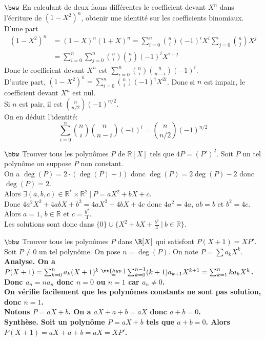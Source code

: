 \documentclass[11pt]{article}
\begin{document}
\begin{exercice}{$\bww$}{}
    En calculant de deux faons différentes le coefficient devant $X^n$ dans l'écriture de $(1-X^2)^n$, obtenir une identité sur les coefficients binomiaux.
    \tcblower
    D'une part
    \begin{align*}
        (1-X^2)^n &= (1-X)^n(1+X)^n = \sum_{i=0}^n\binom{n}{i}(-1)^iX^i\sum_{j=0}\binom{n}{j}X^j\\
        &=\sum_{i=0}^n\sum_{j=0}^n\binom{n}{i}\binom{n}{j}(-1)^iX^{i+j}
    \end{align*}
    Donc le coefficient devant $X^n$ est $\sum_{i=0}^n\binom{n}{i}\binom{n}{n-i}(-1)^i$.\\
    D'autre part, $(1-X^2)^n=\sum_{i=0}^n\binom{n}{i}(-1)^iX^{2i}$. Donc si $n$ est impair, le coefficient devant $X^n$ est nul.\\
    Si $n$ est pair, il est $\binom{n}{n/2}(-1)^{n/2}$.\\
    On en déduit l'identité: 
    \begin{equation*}
        \sum_{i=0}^n\binom{n}{i}\binom{n}{n-i}(-1)^i=\binom{n}{n/2}(-1)^{n/2}
    \end{equation*}
\end{exercice}

\begin{exercice}{$\bbw$}{}
    Trouver tous les polynômes $P$ de $\mathbb{R}[X]$ tels que $4P=(P')^2$.
    \tcblower
    Soit $P$ un tel polynôme on suppose $P$ non constant.\\
    On a $\deg(P)=2\cdot(\deg(P)-1)$ donc $\deg(P)=2\deg(P)-2$ donc $\deg(P)=2$.\\
    Alors $\exists (a,b,c)\in\mathbb{R}^*\times\mathbb{R}^2 ~ | ~ P = aX^2 + bX + c$.\\
    Donc $4a^2X^2 + 4abX + b^2 = 4aX^2 + 4bX + 4c$ donc $4a^2=4a$, $ab = b$ et $b^2=4c$.\\
    Alors $a=1$, $b\in\mathbb{R}$ et $c=\frac{b^2}{4}$.\\
    Les solutions sont donc dans $\{0\}\cup\{X^2+bX+\frac{b^2}{4} ~ | ~ b\in\mathbb{R}\}$.
\end{exercice}

\begin{exercice}{$\bbw$}{}
    Trouver tous les polynômes $P$ dans $\R[X]$ qui satisfont $P(X+1)=XP'$.
    \tcblower
    Soit $P\neq0$ un tel polynôme. On pose $n=\deg(P)$. On note $P=\sum a_kX^k$.\\
    \bf{Analyse.} On a $P(X+1)=\sum_{k=0}^n a_k(X+1)^k~\substack{\nt{hyp.}\\=}\sum_{k=0}^{n-1}(k+1)a_{k+1}X^{k+1}=\sum_{k=1}^nka_kX^k$.\\
    Donc $a_n=na_n$ donc $n=0$ ou $n=1$ car $a_n\neq0$.\\
    On vérifie facilement que les polynômes constants ne sont pas solution, donc $n=1$.\\
    Notons $P=aX+b$. On a $aX+a+b=aX$ donc $a+b=0$.\\
    \bf{Synthèse.} Soit un polynôme $P=aX+b$ tels que $a+b=0$. Alors $P(X+1)=aX+a+b=aX=XP'$.
\end{exercice}
\end{document}
